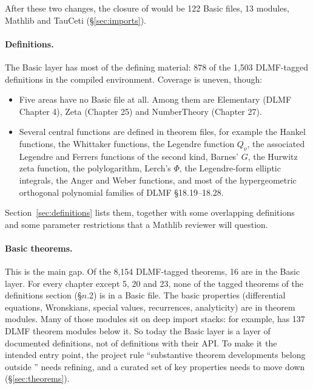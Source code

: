 \documentclass[11pt,a4paper]{article}
\begin{document}
After these two changes, the closure of  would be 122 Basic files, 13
 modules, Mathlib and TauCeti (\S\ref{sec:imports}).

\paragraph{Definitions.} The Basic layer has most of the defining material: 878 of the 1{,}503
DLMF-tagged definitions in the compiled environment. Coverage is uneven, though:

\begin{itemize}
  \item Five areas have no Basic file at all. Among them are Elementary (DLMF Chapter 4), Zeta
    (Chapter 25) and NumberTheory (Chapter 27).
  \item Several central functions are defined in theorem files, for example the Hankel
    functions, the Whittaker functions, the Legendre function \(Q_\nu\), the associated
    Legendre and Ferrers functions of the second kind, Barnes' \(G\), the Hurwitz zeta
    function, the polylogarithm, Lerch's \(\Phi\), the Legendre-form elliptic integrals, the
    Anger and Weber functions, and most of the hypergeometric orthogonal polynomial families
    of DLMF §18.19–18.28.
\end{itemize}

Section~\ref{sec:definitions} lists them, together with some overlapping definitions and some
parameter restrictions that a Mathlib reviewer will question.

\paragraph{Basic theorems.} This is the main gap. Of the 8{,}154 DLMF-tagged theorems, 16 are in
the Basic layer. For every chapter except 5, 20 and 23, none of the tagged theorems of the
definitions section (§\(n\).2) is in a Basic file. The basic properties (differential
equations, Wronskians, special values, recurrences, analyticity) are in theorem modules. Many of
those modules sit on deep import stacks: for example,  has 137 DLMF
theorem modules below it. So today the Basic layer is a layer of documented definitions, not of
definitions with their API. To make it the intended entry point, the project rule ``substantive
theorem developments belong outside '' needs refining, and a curated set of key
properties needs to move down (\S\ref{sec:theorems}).
\end{document}
